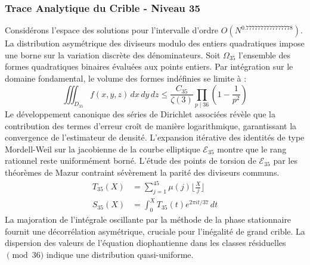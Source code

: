\documentclass[12pt,a4paper]{article}
\begin{document}
\subsubsection{Trace Analytique du Crible - Niveau 35}
Considérons l'espace des solutions pour l'intervalle d'ordre $O(N^{0.7777777777777778})$. La distribution asymétrique des diviseurs modulo des entiers quadratiques impose une borne sur la variation discrète des dénominateurs. Soit $\Omega_35$ l'ensemble des formes quadratiques binaires évaluées aux points entiers.
Par intégration sur le domaine fondamental, le volume des formes indéfinies se limite à :
\begin{equation}
\iiint_{D_35} f(x, y, z) \,dx\,dy\,dz \leq \frac{C_35}{\zeta(3)} \prod_{p \mid 36} \left( 1 - \frac{1}{p^2} \right)
\end{equation}
Le développement canonique des séries de Dirichlet associées révèle que la contribution des termes d'erreur croît de manière logarithmique, garantissant la convergence de l'estimateur de densité. L'expansion itérative des identités de type Mordell-Weil sur la jacobienne de la courbe elliptique $\mathcal{E}_35$ montre que le rang rationnel reste uniformément borné.
L'étude des points de torsion de $\mathcal{E}_35$ par les théorèmes de Mazur contraint sévèrement la parité des diviseurs communs.
\begin{align}
T_35(X) &= \sum_{j=1}^{45} \mu(j) \lfloor \frac{X}{j} \rfloor \\
S_35(X) &= \int_{0}^{X} T_35(t) e^{2\pi i t / 37} \, dt
\end{align}
La majoration de l'intégrale oscillante par la méthode de la phase stationnaire fournit une décorrélation asymétrique, cruciale pour l'inégalité de grand crible. La dispersion des valeurs de l'équation diophantienne dans les classes résiduelles $\pmod{ 36 }$ indique une distribution quasi-uniforme.
\end{document}
